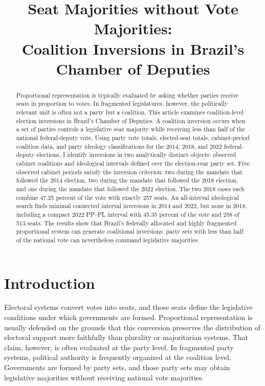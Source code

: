 \documentclass[11pt]{article}
\title{Seat Majorities without Vote Majorities:\\[0.3em]Coalition Inversions in Brazil's Chamber of Deputies}
\author{}
\date{}
\begin{document}
\maketitle

\begin{abstract}
  Proportional representation is typically evaluated by asking whether parties
  receive seats in proportion to votes. In fragmented legislatures, however, the
  politically relevant unit is often not a party but a coalition. This article
  examines coalition-level election inversions in Brazil's Chamber of Deputies.
  A coalition inversion occurs when a set of parties controls a legislative seat
  majority while receiving less than half of the national federal-deputy vote.
  Using party vote totals, elected-seat totals, cabinet-period coalition data,
  and party ideology classifications for the 2014, 2018, and 2022 federal-deputy
  elections, I identify inversions in two analytically distinct objects:
  observed cabinet coalitions and ideological intervals defined over the election-year party set. Five
  observed cabinet periods satisfy the inversion criterion: two during the
  mandate that followed the 2014 election, two during the mandate that followed
  the 2018 election, and one during the mandate that followed the 2022 election.
  The two 2018 cases each combine 47.25 percent of the vote with exactly 257
  seats. An all-interval ideological search finds minimal connected interval
  inversions in 2014 and 2022, but none in 2018, including a compact 2022 PP--PL interval
  with 45.35 percent of the vote and 258 of 513 seats. The results show that
  Brazil’s federally allocated and highly fragmented proportional system can
  generate coalitional inversions: party sets with less than half of the
  national vote can nevertheless command legislative majorities.
\end{abstract}


\section{Introduction}

Electoral systems convert votes into seats, and those seats define the legislative conditions under which governments are formed. Proportional representation is usually defended on the grounds that this conversion preserves the distribution of electoral support more faithfully than plurality or majoritarian systems. That claim, however, is often evaluated at the party level. In fragmented party systems, political authority is frequently organized at the coalition level. Governments are formed by party sets, and those party sets may obtain legislative majorities without receiving national vote majorities.
\end{document}
